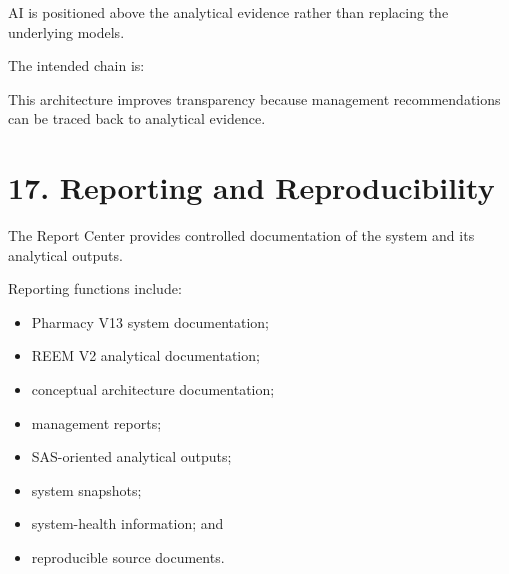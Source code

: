 \documentclass[12pt,a4paper]{article}
\begin{document}
AI is positioned above the analytical evidence rather than replacing the underlying models.

The intended chain is:

\begin{center}
\end{center}

This architecture improves transparency because management recommendations can be traced back to analytical evidence.

\section*{17. Reporting and Reproducibility}

The Report Center provides controlled documentation of the system and its analytical outputs.

Reporting functions include:

\begin{itemize}[leftmargin=1cm]
\item Pharmacy V13 system documentation;
\item REEM V2 analytical documentation;
\item conceptual architecture documentation;
\item management reports;
\item SAS-oriented analytical outputs;
\item system snapshots;
\item system-health information; and
\item reproducible source documents.
\end{itemize}
\end{document}
